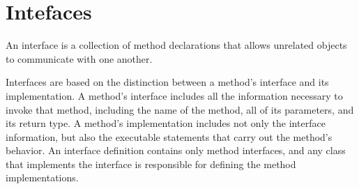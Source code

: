 \section{Intefaces}

%
An interface is a collection of method declarations 
that allows unrelated objects to communicate with one 
another. 

Interfaces are based on the distinction between a 
method’s interface and its implementation. A method’s interface 
includes all the information necessary to invoke that 
method, including the name of the method, all of its 
parameters, and its return type. A method’s 
implementation includes not only the interface 
information, but also the executable statements 
that carry out the method’s behavior. An 
interface definition contains only method 
interfaces, and any class that implements 
the interface is responsible for defining the 
method implementations. \cite[pp.~90-105]{Adobe:AS3man2008}  

